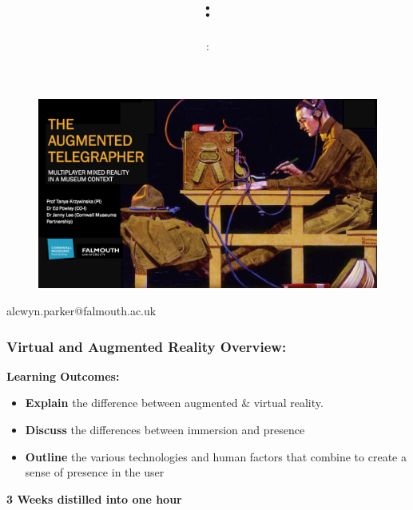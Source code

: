 \usepackage{../../beamerthemeFalmouthGamesAcademy}
\usepackage{multimedia}
\graphicspath{ {../../} }


\usepackage[normalem]{ulem}
\usepackage{wasysym}
\usepackage{gensymb}
\usepackage{pdfpages}

\usetikzlibrary{arrows,automata}




\title{\sessionnumber: }
\subtitle{\modulecode: \moduletitle }

\frame{\titlepage} 
\begin{frame}
	\begin{figure}
		\includegraphics[scale=0.2]{assets/tel.png}
		
	\end{figure}
	alcwyn.parker@falmouth.ac.uk
\end{frame}

\begin{frame}
	\frametitle{Virtual and Augmented Reality Overview:}
	
	\textbf{Learning Outcomes:}
	
	\begin{itemize}
		\item \textbf{Explain} the difference between augmented \& virtual reality. 
		\item \textbf{Discuss} the differences between immersion and presence
		\item \textbf{Outline} the various technologies and human factors that combine to create a sense of presence in the user
	\end{itemize}
	
	\textbf{3 Weeks distilled into one hour}

\end{frame}

